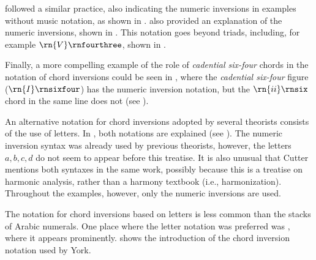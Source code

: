 
\textcite{chadwick1897harmony} followed a similar practice,
also indicating the numeric inversions in examples without
music notation, as shown in
.
\textcite{chadwick1897harmony} also provided an explanation
of the numeric inversions, shown in
. This
notation goes beyond triads, including, for example
$\rn{V}\rnfourthree$, shown in
.

Finally, a more compelling example of the role of
\emph{cadential six-four} chords in the notation of chord
inversions could be seen in
\textcite{loewengard1908lehrbuch}, where the \emph{cadential
six-four} figure ($\rn{I}\rnsixfour$) has the numeric
inversion notation, but the $\rn{ii}\rnsix$ chord in the
same line does not (see
).





An alternative notation for chord inversions adopted by
several theorists consists of the use of letters. In
\textcite{cutter1902harmonic}, both notations are explained
(see ). The
numeric inversion syntax was already used by previous
theorists, however, the letters ${a, b, c , d}$ do not seem
to appear before this treatise. It is also unusual that
Cutter mentions both syntaxes in the same work, possibly
because this is a treatise on harmonic analysis, rather than
a harmony textbook (i.e., harmonization). Throughout the
examples, however, only the numeric inversions are used.


The notation for chord inversions based on letters is less
common than the stacks of Arabic numerals. One place where
the letter notation was preferred was
\textcite{york1909practical}, where it appears prominently.
 shows the
introduction of the chord inversion notation used by York.

